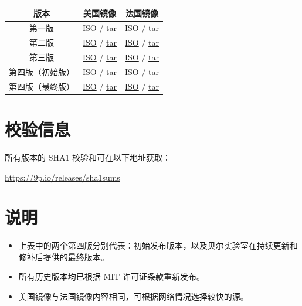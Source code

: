 \documentclass[12pt,UTF8]{ctexbook}
\begin{document}
\begin{center}
\begin{longtable}{|c|c|c|}
\hline
\textbf{版本} & \textbf{美国镜像} & \textbf{法国镜像} \\
\hline
第一版 & \href{https://9p.io/releases/1st/plan9-1st.iso}{ISO} / \href{https://9p.io/releases/1st/plan9-1st.tar}{tar} & \href{https://9p.io/france/releases/1st/plan9-1st.iso}{ISO} / \href{https://9p.io/france/releases/1st/plan9-1st.tar}{tar} \\
第二版 & \href{https://9p.io/releases/2nd/plan9-2nd.iso}{ISO} / \href{https://9p.io/releases/2nd/plan9-2nd.tar}{tar} & \href{https://9p.io/france/releases/2nd/plan9-2nd.iso}{ISO} / \href{https://9p.io/france/releases/2nd/plan9-2nd.tar}{tar} \\
第三版 & \href{https://9p.io/releases/3rd/plan9-3rd.iso}{ISO} / \href{https://9p.io/releases/3rd/plan9-3rd.tar}{tar} & \href{https://9p.io/france/releases/3rd/plan9-3rd.iso}{ISO} / \href{https://9p.io/france/releases/3rd/plan9-3rd.tar}{tar} \\
第四版（初始版） & \href{https://9p.io/releases/4th/plan9-4th.iso}{ISO} / \href{https://9p.io/releases/4th/plan9-4th.tar}{tar} & \href{https://9p.io/france/releases/4th/plan9-4th.iso}{ISO} / \href{https://9p.io/france/releases/4th/plan9-4th.tar}{tar} \\
第四版（最终版） & \href{https://9p.io/releases/4th/plan9-4th-final.iso}{ISO} / \href{https://9p.io/releases/4th/plan9-4th-final.tar}{tar} & \href{https://9p.io/france/releases/4th/plan9-4th-final.iso}{ISO} / \href{https://9p.io/france/releases/4th/plan9-4th-final.tar}{tar} \\
\hline
\end{longtable}
\end{center}

\section*{校验信息}
所有版本的 SHA1 校验和可在以下地址获取：
\begin{center}
	\url{https://9p.io/releases/sha1sums}
\end{center}

\section*{说明}
\begin{itemize}
	\item 上表中的两个第四版分别代表：初始发布版本，以及贝尔实验室在持续更新和修补后提供的最终版本。
	\item 所有历史版本均已根据 MIT 许可证条款重新发布。
	\item 美国镜像与法国镜像内容相同，可根据网络情况选择较快的源。
\end{itemize}
\end{document}
